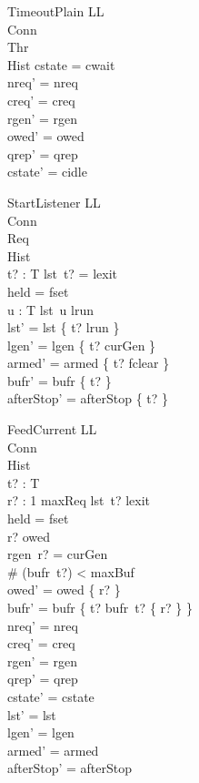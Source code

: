 \documentclass[a4paper,10pt,fleqn]{article}
\begin{document}
\begin{schema}{TimeoutPlain}
  \Delta LL \\
  \Xi Conn \\
  \Xi Thr \\
  \Xi Hist
\where
  cstate = cwait \\
  nreq' = nreq \\
  creq' = creq \\
  rgen' = rgen \\
  owed' = owed \\
  qrep' = qrep \\
  cstate' = cidle
\end{schema}

\begin{schema}{StartListener}
  \Delta LL \\
  \Xi Conn \\
  \Xi Req \\
  \Xi Hist \\
  t? : T
\where
  lst~t? = lexit \\
  held = fset \\
  \forall u : T \spot lst~u \neq lrun \\
  lst' = lst \oplus \{ t? \mapsto lrun \} \\
  lgen' = lgen \oplus \{ t? \mapsto curGen \} \\
  armed' = armed \oplus \{ t? \mapsto fclear \} \\
  bufr' = bufr \oplus \{ t? \mapsto \emptyset \} \\
  afterStop' = afterStop \oplus \{ t?  \}
\end{schema}

\begin{schema}{FeedCurrent}
  \Delta LL \\
  \Xi Conn \\
  \Xi Hist \\
  t? : T \\
  r? : 1 \upto maxReq
\where
  lst~t? \neq lexit \\
  held = fset \\
  r? \in owed \\
  rgen~r? = curGen \\
  \# (bufr~t?) < maxBuf \\
  owed' = owed \setminus \{ r? \} \\
  bufr' = bufr \oplus \{ t? \mapsto bufr~t? \cup \{ r? \} \} \\
  nreq' = nreq \\
  creq' = creq \\
  rgen' = rgen \\
  qrep' = qrep \\
  cstate' = cstate \\
  lst' = lst \\
  lgen' = lgen \\
  armed' = armed \\
  afterStop' = afterStop
\end{schema}
\end{document}
